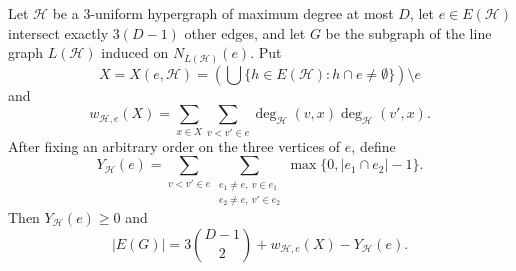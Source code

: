 \begin{lemma}
Let $\mathcal H$ be a $3$-uniform hypergraph of maximum degree at most $D$,
let $e\in E(\mathcal H)$ intersect exactly $3(D-1)$ other edges, and let
$G$ be the subgraph of the line graph $L(\mathcal H)$ induced on
$N_{L(\mathcal H)}(e)$.  Put
\[
X=X(e,\mathcal H)=
\left(\bigcup\{h\in E(\mathcal H):h\cap e\ne\emptyset\}\right)\setminus e
\]
and
\[
w_{\mathcal H,e}(X)=
\sum_{x\in X}\sum_{v<v'\in e}
\deg_{\mathcal H}(v,x)\deg_{\mathcal H}(v',x).
\]
After fixing an arbitrary order on the three vertices of $e$, define
\[
Y_{\mathcal H}(e)=
\sum_{v<v'\in e}
\sum_{\substack{e_1\ne e,\ v\in e_1\\ e_2\ne e,\ v'\in e_2}}
\max\{0, |e_1\cap e_2|-1\}.
\]
Then $Y_{\mathcal H}(e)\ge 0$ and
\[
|E(G)|=3\binom{D-1}{2}+w_{\mathcal H,e}(X)-Y_{\mathcal H}(e).
\]
\end{lemma}
